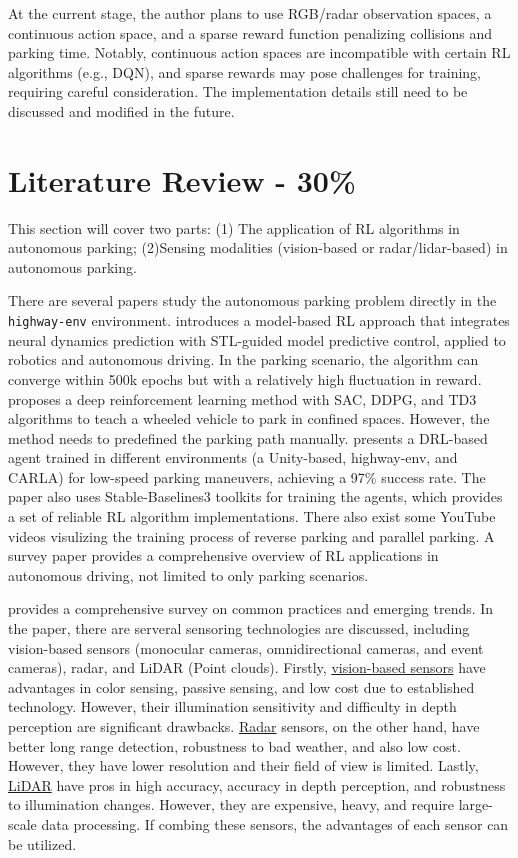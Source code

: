 \documentclass{article}
\begin{document}
At the current stage, the author plans to use RGB/radar observation spaces, a continuous action space, and a sparse reward function penalizing collisions and parking time. Notably, continuous action spaces are incompatible with certain RL algorithms (e.g., DQN), and sparse rewards may pose challenges for training, requiring careful consideration. The implementation details still need to be discussed and modified in the future.

\section{Literature Review - 30\%}

This section will cover two parts: (1) The application of RL algorithms in autonomous parking; (2)Sensing modalities (vision-based or radar/lidar-based) in autonomous parking.

There are several papers study the autonomous parking problem directly in the \texttt{highway-env} environment. \citet{kapoor2020model} introduces a model-based RL approach that integrates neural dynamics prediction with STL-guided model predictive control, applied to robotics and autonomous driving. In the parking scenario, the algorithm can converge within 500k epochs but with a relatively high fluctuation in reward. \citet{moreira2021deep} proposes a deep reinforcement learning method with SAC, DDPG, and TD3 algorithms to teach a wheeled vehicle to park in confined spaces. However, the method needs to predefined the parking path manually. \citet{lazzaroni2023automated} presents a DRL-based agent trained in different environments (a Unity-based, highway-env, and CARLA) for low-speed parking maneuvers, achieving a 97\% success rate. The paper also uses Stable-Baselines3 \cite{stable-baselines3} toolkits for training the agents, which provides a set of reliable RL algorithm implementations. There also exist some YouTube videos \citep{youtube2019,youtube2022} visulizing the training process of reverse parking and parallel parking. A survey paper \cite{elallid2022comprehensive} provides a comprehensive overview of RL applications in autonomous driving, not limited to only parking scenarios.

\citet{yurtsever2020survey} provides a comprehensive survey on common practices and emerging trends. In the paper, there are serveral sensoring technologies are discussed, including vision-based sensors (monocular cameras, omnidirectional cameras, and event cameras), radar, and LiDAR (Point clouds). Firstly, \underline{vision-based sensors} have advantages in color sensing, passive sensing, and low cost due to established technology. However, their illumination sensitivity and difficulty in depth perception are significant drawbacks. \underline{Radar} sensors, on the other hand, have better long range detection, robustness to bad weather, and also low cost. However, they have lower resolution and their field of view is limited. Lastly, \underline{LiDAR} have pros in high accuracy, accuracy in depth perception, and robustness to illumination changes. However, they are expensive, heavy, and require large-scale data processing. If combing these sensors, the advantages of each sensor can be utilized.
\end{document}
